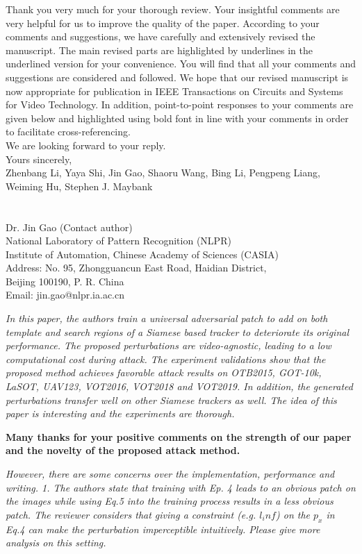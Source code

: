 \documentclass[12pt]{article}
\begin{document}
Thank you very much for your thorough review. Your insightful comments are very helpful for us to improve the quality of the paper. According to your comments and suggestions, we have carefully and extensively revised the manuscript. The main revised parts are highlighted by underlines in the underlined version for your convenience. You will find that all your comments and suggestions are considered and followed. We hope that our revised manuscript is now appropriate for publication in IEEE Transactions on Circuits and Systems for Video Technology.
In addition, point-to-point responses to your comments are given below and highlighted using bold font in line with your comments in order to facilitate cross-referencing.\\[10pt]
\indent We are looking forward to your reply.\\[10pt]
\noindent Yours sincerely,\\
\noindent Zhenbang Li, Yaya Shi, Jin Gao, Shaoru Wang, Bing Li, Pengpeng Liang, Weiming Hu, Stephen J. Maybank
\\
\\
\\
\noindent Dr. Jin Gao (Contact author)\\
\noindent National Laboratory of Pattern Recognition (NLPR)\\
\noindent Institute of Automation, Chinese Academy of Sciences (CASIA)\\
\noindent Address: No. 95, Zhongguancun East Road, Haidian District,\\
\noindent Beijing 100190, P. R. China\\
\noindent Email: jin.gao@nlpr.ia.ac.cn

\newpage
\textit{In this paper, the authors train a universal adversarial patch to add on both template and search regions of a Siamese based tracker to deteriorate its original performance. The proposed perturbations are video-agnostic, leading to a low computational cost during attack. The experiment validations show that the proposed method achieves favorable attack results on OTB2015, GOT-10k, LaSOT, UAV123, VOT2016, VOT2018 and VOT2019. In addition, the generated perturbations transfer well on other Siamese trackers as well. The idea of this paper is interesting and the experiments are thorough.}

\textbf{Many thanks for your positive comments on the strength of our paper and the novelty of the proposed attack method.}

\textit{However, there are some concerns over the implementation, performance and writing. 1. The authors state that training with Ep. 4 leads to an obvious patch on the images while using Eq.5 into the training process results in a less obvious patch. The reviewer considers that giving a constraint (e.g. $l_inf$) on the $p_x$ in Eq.4 can make the perturbation imperceptible intuitively. Please give more analysis on this setting.}
\end{document}
